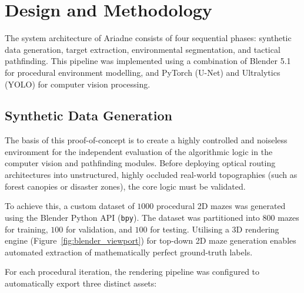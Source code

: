 \documentclass[12pt, a4paper]{article}
\begin{document}
\vspace{0.5cm}

\section{Design and Methodology}

The system architecture of Ariadne consists of four sequential phases: synthetic data generation, target extraction, environmental segmentation, and tactical pathfinding. This pipeline was implemented using a combination of Blender 5.1 for procedural environment modelling, and PyTorch (U-Net) and Ultralytics (YOLO) for computer vision processing.

\vspace{0.5cm}

\subsection{Synthetic Data Generation}

\quad The basis of this proof-of-concept is to create a highly controlled and noiseless environment for the independent evaluation of the algorithmic logic in the computer vision and pathfinding modules. Before deploying optical routing architectures into unstructured, highly occluded real-world topographies (such as forest canopies or disaster zones), the core logic must be validated.

\vspace{0.5cm}

To achieve this, a custom dataset of $1000$ procedural 2D mazes was generated using the Blender Python API (\texttt{bpy}). The dataset was partitioned into $800$ mazes for training, $100$ for validation, and $100$ for testing. Utilising a 3D rendering engine (Figure~\ref{fig:blender_viewport}) for top-down 2D maze generation enables automated extraction of mathematically perfect ground-truth labels.

\vspace{0.5cm}

\hspace{-1.5em}For each procedural iteration, the rendering pipeline was configured to automatically export three distinct assets:
\end{document}
